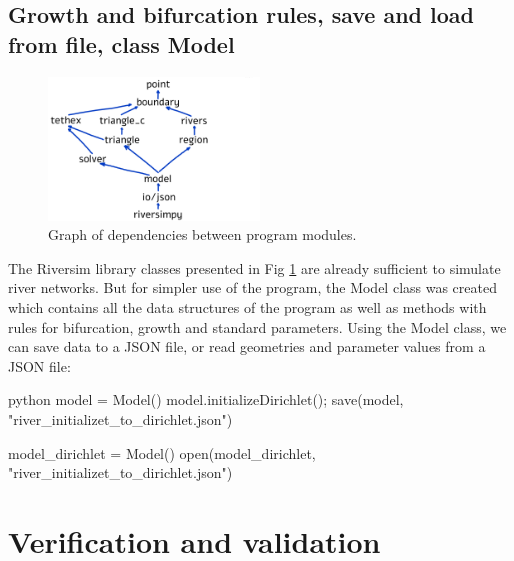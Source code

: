 \documentclass[]{pracamgr}
\begin{document}
    \section{Growth and bifurcation rules, save and load from file, class Model}
      \begin{figure}[H]
        \centering
        \includegraphics[width=0.5\textwidth]{figs/program_dependecy_graph.png}        
        \caption{Graph of dependencies between program modules.}
        \label{program_strucutre}
      \end{figure}

    The Riversim library classes presented in Fig \ref{program_strucutre} are already sufficient to simulate river networks. But for simpler use of the program, the Model class was created which contains all the data structures of the program as well as methods with rules for bifurcation, growth and standard parameters. Using the Model class, we can save data to a JSON file, or read geometries and parameter values from a JSON file:

    \begin{mintedbox}{python}
      model = Model()
      model.initializeDirichlet();
      save(model, "river_initializet_to_dirichlet.json")
      
      model_dirichlet = Model()
      open(model_dirichlet, "river_initializet_to_dirichlet.json")\end{mintedbox}


  \chapter{Verification and validation}
\end{document}
